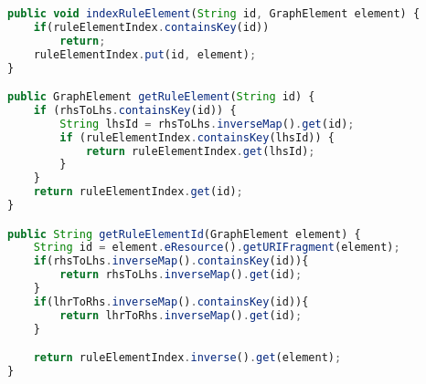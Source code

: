 \begin{lstlisting}[language=TypeScript, caption={Parts of \code{RuleModelIndex}}, label={lst:rule-indexing}]
public void indexRuleElement(String id, GraphElement element) {
    if(ruleElementIndex.containsKey(id))
        return;
    ruleElementIndex.put(id, element);
}

public GraphElement getRuleElement(String id) {
    if (rhsToLhs.containsKey(id)) {
        String lhsId = rhsToLhs.inverseMap().get(id);
        if (ruleElementIndex.containsKey(lhsId)) {
            return ruleElementIndex.get(lhsId);
        }
    }
    return ruleElementIndex.get(id);
}

public String getRuleElementId(GraphElement element) {
    String id = element.eResource().getURIFragment(element);
    if(rhsToLhs.inverseMap().containsKey(id)){
        return rhsToLhs.inverseMap().get(id);
    }
    if(lhrToRhs.inverseMap().containsKey(id)){
        return lhrToRhs.inverseMap().get(id);
    }

    return ruleElementIndex.inverse().get(element);
}
\end{lstlisting}